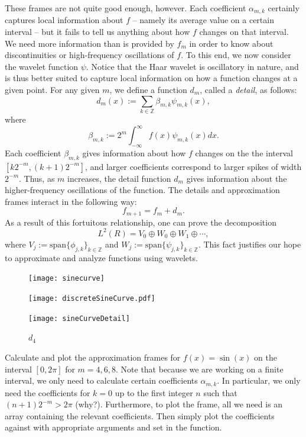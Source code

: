 These frames are not quite good enough, however. Each coefficient $\alpha_{m,k}$
certainly captures local information about $f$ -- namely its average value on
a certain interval -- but it fails to tell us anything about how $f$ changes
on that interval. We need more information than is provided by $f_m$ in order
to know about discontinuities or high-frequency oscillations of $f$. To this end,
we now consider the wavelet function $\psi$.
Notice that the Haar wavelet is oscillatory in nature, and is thus better suited
to capture local information on how a function changes at a given point. For
any given $m$, we define a function $d_m$, called a \emph{detail}, as follows:
\begin{equation*}
d_m(x) := \displaystyle\sum_{k \in \mathbb{Z}}\beta_{m,k}\psi_{m,k}(x),
\end{equation*}
where
\begin{equation*}
\beta_{m,k} := 2^m \displaystyle \int_{-\infty}^{\infty}f(x) \psi_{m,k}(x) dx.
\end{equation*}
Each coefficient $\beta_{m,k}$ gives information about how $f$ changes on the
the interval $[k2^{-m}, (k+1)2^{-m}]$, and larger coefficients correspond
to larger spikes of width $2^{-m}$. Thus, as $m$ increases, the
detail function $d_m$ gives information about the higher-frequency oscillations
of the function. The details and approximation frames interact in the following way:
\begin{equation*}
f_{m+1} = f_m + d_m.
\end{equation*}
As a result of this fortuitous relationship, one can prove the decomposition
\begin{equation*}
L^2(R) = V_0 \oplus W_0 \oplus W_1 \oplus \cdots,
\end{equation*}
where $V_j := \text{span}\{\phi_{j,k}\}_{k \in \mathbb{Z}}$ and
$W_j := \text{span}\{\psi_{j,k}\}_{k \in \mathbb{Z}}$. This fact justifies
our hope to approximate and analyze functions using wavelets.
\begin{figure}[t]
    \texttt{[image: sinecurve]}
    \caption{$f(x) = \sin (x)$}
\endminipage\hfill
{}
    \texttt{[image: discreteSineCurve.pdf]}
    \caption{$f_4$}
\endminipage\hfill
{}
    \texttt{[image: sineCurveDetail]}
    \caption{$d_4$}
\endminipage
\end{figure}
\begin{problem}
Calculate and plot the approximation frames for $f(x) = \sin(x)$ on the interval $[0,2\pi]$
for $m = 4, 6, 8$. Note that because we are working on a finite interval,
we only need to calculate certain coefficients $\alpha_{m,k}$. In
particular, we only need the coefficients for $k = 0$ up to the first integer
$n$ such that $(n+1)2^{-m} > 2 \pi$ (why?). Furthermore, to plot the frame,
all we need is an array containing the relevant coefficients. Then simply plot
the coefficients against  with appropriate arguments
and set  in the  function.
\end{problem}

